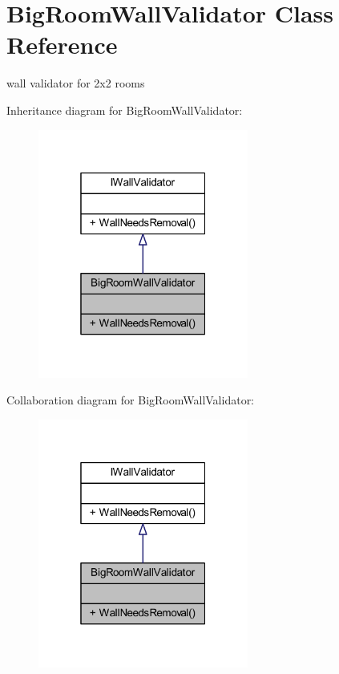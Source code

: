 \hypertarget{class_big_room_wall_validator}{}\section{Big\+Room\+Wall\+Validator Class Reference}
\label{class_big_room_wall_validator}


wall validator for 2x2 rooms  




Inheritance diagram for Big\+Room\+Wall\+Validator\+:
\nopagebreak
\begin{figure}[H]
\begin{center}
\leavevmode
\includegraphics[width=196pt]{class_big_room_wall_validator__inherit__graph}
\end{center}
\end{figure}


Collaboration diagram for Big\+Room\+Wall\+Validator\+:
\nopagebreak
\begin{figure}[H]
\begin{center}
\leavevmode
\includegraphics[width=196pt]{class_big_room_wall_validator__coll__graph}
\end{center}
\end{figure}
